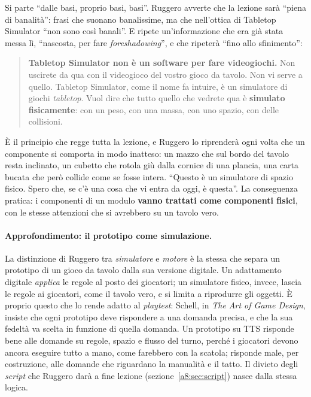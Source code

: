 Si parte ``dalle basi, proprio basi, basi''. Ruggero avverte che la lezione sarà
``piena di banalità'': frasi che suonano banalissime, ma che nell'ottica di Tabletop
Simulator ``non sono così banali''. E ripete un'informazione che era già stata messa
lì, ``nascosta, per fare \emph{foreshadowing}'', e che ripeterà ``fino allo
sfinimento'':

\begin{quote}
\textbf{Tabletop Simulator non è un software per fare videogiochi.} Non uscirete da qua
con il videogioco del vostro gioco da tavolo. Non vi serve a quello. Tabletop
Simulator, come il nome fa intuire, è un simulatore di giochi \emph{tabletop}. Vuol
dire che tutto quello che vedrete qua è \textbf{simulato fisicamente}: con un peso,
con una massa, con uno spazio, con delle collisioni.
\end{quote}

È il principio che regge tutta la lezione, e Ruggero lo riprenderà ogni volta che un
componente si comporta in modo inatteso: un mazzo che sul bordo del tavolo resta
inclinato, un cubetto che rotola giù dalla cornice di una plancia, una carta bucata
che però collide come se fosse intera. ``Questo è un simulatore di spazio fisico.
Spero che, se c'è una cosa che vi entra da oggi, è questa''. La conseguenza pratica:
i componenti di un modulo \textbf{vanno trattati come componenti fisici}, con le
stesse attenzioni che si avrebbero su un tavolo vero.

\paragraph{Approfondimento: il prototipo come simulazione.} La distinzione di Ruggero
tra \emph{simulatore} e \emph{motore} è la stessa che separa un prototipo di un gioco
da tavolo dalla sua versione digitale. Un adattamento digitale \emph{applica} le
regole al posto dei giocatori; un simulatore fisico, invece, lascia le regole ai
giocatori, come il tavolo vero, e si limita a riprodurre gli oggetti. È proprio questo
che lo rende adatto al \emph{playtest}: Schell, in \emph{The Art of Game Design},
insiste che ogni prototipo deve rispondere a una domanda precisa, e che la sua
fedeltà va scelta in funzione di quella domanda. Un prototipo su TTS risponde bene
alle domande su regole, spazio e flusso del turno, perché i giocatori devono ancora
eseguire tutto a mano, come farebbero con la scatola; risponde male, per costruzione,
alle domande che riguardano la manualità e il tatto. Il divieto degli \emph{script}
che Ruggero darà a fine lezione (sezione~\ref{a8:sec:script}) nasce dalla stessa
logica.

